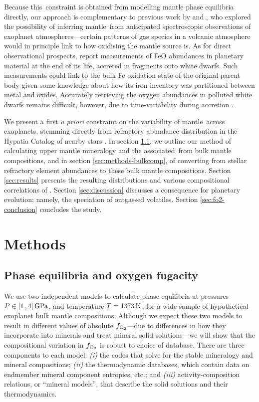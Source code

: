 Because this \fo\,constraint is obtained from modelling mantle phase equilibria directly, our approach is complementary to previous work by \citet{ortenzi_mantle_2020} and \citet{liggins_growth_2022}, who explored the possibility of inferring mantle \fo\,from anticipated spectroscopic observations of exoplanet atmospheres---certain patterns of gas species in a volcanic atmosphere would in principle link to how oxidising the mantle source is. As for direct observational prospects, \citet{doyle_oxygen_2019, doyle_where_2020, doyle_new_2023} report measurements of FeO abundances in planetary material at the end of its life, accreted in fragments onto white dwarfs. Such measurements could link to the bulk Fe oxidation state of the original parent body given some knowledge about how its iron inventory was partitioned between metal and oxides. Accurately retrieving the oxygen abundances in polluted white dwarfs remains difficult, however, due to time-variability during accretion \citep{brouwers_asynchronous_2023}.

We present a first \textit{a priori} constraint on the variability of mantle \fo\,across exoplanets, stemming directly from refractory abundance distribution in the Hypatia Catalog of nearby stars \citep{hinkel_stellar_2014}. In section \ref{sec:methods-mineralogy}, we outline our method of calculating upper mantle mineralogy and the associated \fo\,from bulk mantle compositions, and in section \ref{sec:methods-bulkcomp}, of converting from stellar refractory element abundances to these bulk mantle compositions. Section \ref{sec:results} presents the resulting distributions and various compositional correlations of \fo. Section \ref{sec:discussion} discusses a consequence for planetary evolution; namely, the speciation of outgassed volatiles. Section \ref{sec:fo2-conclusion} concludes the study.


\section{Methods}



\subsection{Phase equilibria and oxygen fugacity}\label{sec:methods-mineralogy}

We use two independent models to calculate phase equilibria at pressures $P \in [1\,,4]\,{\rm GPa}$, and temperature $T = 1373\,{\rm K}$, for a wide sample of hypothetical exoplanet bulk mantle compositions. Although we expect these two models to result in different values of absolute $f_{\ce{O2}}$---due to differences in how they incorporate  into minerals and treat mineral solid solutions---we will show that the compositional variation in $f_{\ce{O2}}$ is robust to choice of database. There are three components to each model: \textit{(i)} the codes that solve for the stable mineralogy and mineral compositions; \textit{(ii)} the thermodynamic databases, which contain data on endmember mineral component entropies, etc.; and \textit{(iii)} activity-composition relations, or ``mineral models'', that describe the solid solutions and their thermodynamics. 

